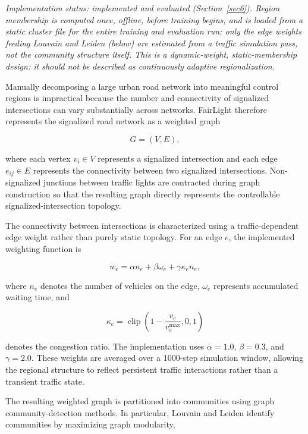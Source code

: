 \documentclass[3p,times]{elsarticle}
\theoremstyle{plain}
\theoremstyle{definition}
\begin{document}
\textit{Implementation status: implemented and evaluated
(Section~\ref{sec6}). Region membership is computed once, offline,
before training begins, and is loaded from a static cluster file for
the entire training and evaluation run; only the edge weights feeding
Louvain and Leiden (below) are estimated from a traffic simulation
pass, not the community structure itself. This is a dynamic-weight,
static-membership design: it should not be described as continuously
adaptive regionalization.}

Manually decomposing a large urban road network into meaningful
control regions is impractical because the number and connectivity of
signalized intersections can vary substantially across networks.
FairLight therefore represents the signalized road network as a
weighted graph

\begin{equation}
G = (V, E),
\end{equation}

where each vertex $v_i \in V$ represents a signalized intersection and
each edge $e_{ij} \in E$ represents the connectivity between two
signalized intersections. Non-signalized junctions between traffic
lights are contracted during graph construction so that the resulting
graph directly represents the controllable signalized-intersection
topology.

The connectivity between intersections is characterized using a
traffic-dependent edge weight rather than purely static topology. For
an edge $e$, the implemented weighting function is

\begin{equation}
w_e = \alpha n_e + \beta \omega_e + \gamma \kappa_e n_e,
\end{equation}

where $n_e$ denotes the number of vehicles on the edge, $\omega_e$
represents accumulated waiting time, and

\begin{equation}
\kappa_e =
\operatorname{clip}\!\left(1 - \frac{v_e}{v_e^{\max}}, 0, 1\right)
\end{equation}

denotes the congestion ratio. The implementation uses $\alpha = 1.0$,
$\beta = 0.3$, and $\gamma = 2.0$. These weights are averaged over a
1000-step simulation window, allowing the regional structure to
reflect persistent traffic interactions rather than a transient
traffic state.

The resulting weighted graph is partitioned into communities using
graph community-detection methods. In particular, Louvain and Leiden
identify communities by maximizing graph modularity,
\end{document}
